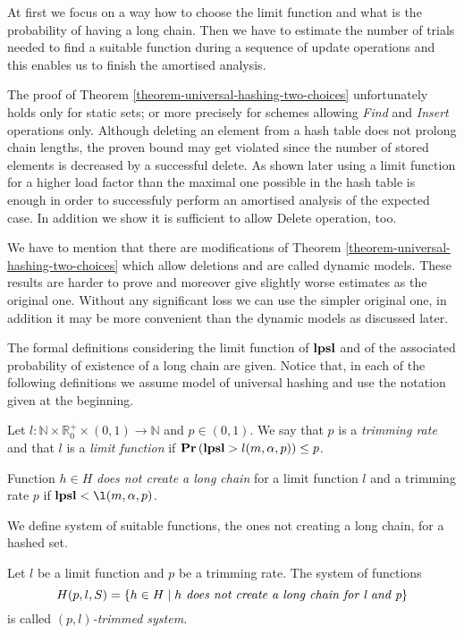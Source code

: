 At first we focus on a way how to choose the limit function and what is the probability of having a long chain. Then we have to estimate the number of trials needed to find a suitable function during a sequence of update operations and this enables us to finish the amortised analysis.

The proof of Theorem \ref{theorem-universal-hashing-two-choices} unfortunately holds only for static sets; or more precisely for schemes allowing \emph{Find} and \emph{Insert} operations only. Although deleting an element from a hash table does not prolong chain lengths, the proven bound may get violated since the number of stored elements is decreased by a successful delete. As shown later using a limit function for a higher load factor than the maximal one possible in the hash table is enough in order to successfuly perform an amortised analysis of the expected case. In addition we show it is sufficient to allow Delete operation, too. 

We have to mention that there are modifications of Theorem \ref{theorem-universal-hashing-two-choices} which allow deletions and are called dynamic models. These results are harder to prove and moreover give slightly worse estimates as the original one. Without any significant loss we can use the simpler original one, in addition it may be more convenient than the dynamic models as discussed later.

The formal definitions considering the limit function of $\mathbf{lpsl}$ and of the associated probability of existence of a long chain are given. Notice that, in each of the following definitions we assume model of universal hashing and use the notation given at the beginning.

\begin{definition}
Let $l: \mathbb{N} \times \mathbb{R}_0^+ \times (0, 1) \rightarrow \mathbb{N}$ and $p \in (0, 1)$.  We say that $p$ is a \emph{trimming rate} and that $l$ is a \emph{limit function} if  $\mathbf{Pr}\left(\mathbf{lpsl} > l(m, \alpha, p)\right) \leq p$.

Function $h \in H$ \emph{does not create a long chain} for a limit function $l$ and a trimming rate $p$ if $\lpsl < \l(m, \alpha, p)$.
\end{definition}

We define system of suitable functions, the ones not creating a long chain, for a hashed set.
\begin{definition}
Let $l$ be a limit function and $p$ be a trimming rate. The system of functions \[ H(p, l, S) = \{ h \in H \mid h \textit{ does not create a long chain for l and p} \} \] is called \emph{$(p, l)$-trimmed system}.
\end{definition}

